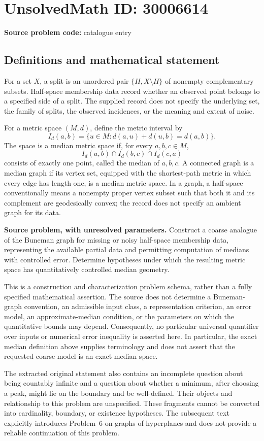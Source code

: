 \documentclass[11pt]{article}
\begin{document}
\section*{UnsolvedMath ID: 30006614}
\textbf{Source problem code:} catalogue entry
\subsection{Definitions and mathematical statement}
For a set \(X\), a split is an unordered pair \(\{H,X\setminus H\}\) of nonempty complementary subsets. Half-space membership data record whether an observed point belongs to a specified side of a split. The supplied record does not specify the underlying set, the family of splits, the observed incidences, or the meaning and extent of noise.

For a metric space \((M,d)\), define the metric interval by
\[
I_d(a,b)=\{u\in M:d(a,u)+d(u,b)=d(a,b)\}.
\]
The space is a median metric space if, for every \(a,b,c\in M\),
\[
I_d(a,b)\cap I_d(b,c)\cap I_d(c,a)
\]
consists of exactly one point, called the median of \(a,b,c\). A connected graph is a median graph if its vertex set, equipped with the shortest-path metric in which every edge has length one, is a median metric space. In a graph, a half-space conventionally means a nonempty proper vertex subset such that both it and its complement are geodesically convex; the record does not specify an ambient graph for its data.

\textbf{Source problem, with unresolved parameters.} Construct a coarse analogue of the Buneman graph for missing or noisy half-space membership data, representing the available partial data and permitting computation of medians with controlled error. Determine hypotheses under which the resulting metric space has quantitatively controlled median geometry.

This is a construction and characterization problem schema, rather than a fully specified mathematical assertion. The source does not determine a Buneman-graph convention, an admissible input class, a representation criterion, an error model, an approximate-median condition, or the parameters on which the quantitative bounds may depend. Consequently, no particular universal quantifier over inputs or numerical error inequality is asserted here. In particular, the exact median definition above supplies terminology and does not assert that the requested coarse model is an exact median space.

The extracted original statement also contains an incomplete question about being countably infinite and a question about whether a minimum, after choosing a peak, might lie on the boundary and be well-defined. Their objects and relationship to this problem are unspecified. These fragments cannot be converted into cardinality, boundary, or existence hypotheses. The subsequent text explicitly introduces Problem~6 on graphs of hyperplanes and does not provide a reliable continuation of this problem.
\end{document}
